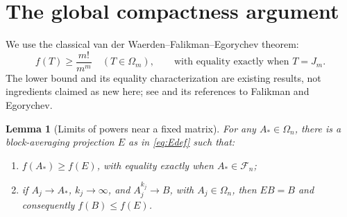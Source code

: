 \documentclass[11pt]{article}
\newtheorem{lemma}[theorem]{Lemma}
\theoremstyle{remark}\newtheorem{remark}[theorem]{Remark}
\newcommand{\Om}{\Omega_n}
\newcommand{\Fset}{\mathcal F_n}
\begin{document}
\section{The global compactness argument}
We use the classical van der Waerden--Falikman--Egorychev theorem:
\begin{equation}\label{eq:vdw}
 f(T)\ge\frac{m!}{m^m}\quad(T\in\Omega_m),
 \qquad\text{with equality exactly when }T=J_m.
\end{equation}
The lower bound and its equality characterization are existing results,
not ingredients claimed as new here; see \cite{Gurvits} and its
references to Falikman and Egorychev.

\begin{lemma}[Limits of powers near a fixed matrix]\label{lem:global}
For any $A_*\in\Om$, there is a block-averaging projection $E$ as in
\eqref{eq:Edef} such that:
\begin{enumerate}[label=(\roman*)]
\item $f(A_*)\ge f(E)$, with equality exactly when $A_*\in\Fset$;
\item if $A_j\to A_*$, $k_j\to\infty$, and $A_j^{k_j}\to B$, with
$A_j\in\Om$, then $EB=B$ and consequently $f(B)\le f(E)$.
\end{enumerate}
\end{lemma}
\end{document}
